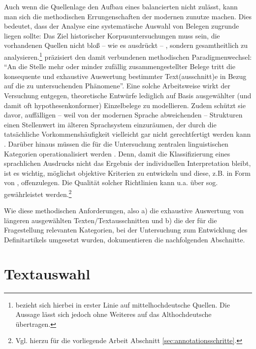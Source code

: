 Auch wenn die Quellenlage den Aufbau eines balancierten  nicht zulässt, kann man sich die methodischen Errungenschaften der modernen  zunutze machen. Dies bedeutet, dass der Analyse eine systematische Auswahl von Belegen zugrunde liegen sollte: Das Ziel historischer Korpusuntersuchungen  muss sein, die vorhandenen Quellen nicht bloß -- wie es \textcite[1310]{Wegera2000} ausdrückt -- , sondern gesamtheitlich zu analysieren.\footnote{\textcite{Wegera2000} bezieht sich hierbei in erster Linie auf mittelhochdeutsche Quellen. Die Aussage lässt sich jedoch ohne Weiteres auf das Althochdeutsche übertragen.} \textcite[382]{Fleischer2015} präzisiert den damit verbundenen methodischen Paradigmenwechsel:
"`An die Stelle mehr oder minder zufällig zusammengestellter Belege tritt die konsequente und exhaustive Auswertung bestimmter Text(ausschnitt)e in Bezug auf die zu untersuchenden Phänomene"'. Eine solche Arbeitsweise wirkt der Versuchung entgegen, theoretische Entwürfe lediglich auf Basis ausgewählter (und damit oft hypothesenkonformer) Einzelbelege zu modellieren. Zudem schützt sie davor, auffälligen -- weil von der modernen Sprache abweichenden -- Strukturen einen Stellenwert im älteren Sprachsystem einzuräumen, der durch die tatsächliche Vorkommenshäufigkeit vielleicht gar nicht gerechtfertigt werden kann \parencite[383]{Fleischer2015}. Darüber hinaus müssen die für die Untersuchung zentralen linguistischen Kategorien operationalisiert  werden  \parencite[113--116]{Lemnitzer2015}. Denn, damit die Klassifizierung eines sprachlichen Ausdrucks nicht das Ergebnis der individuellen Interpretation bleibt, ist es wichtig, möglichst objektive  Kriterien zu entwickeln und diese, z.B. in Form von , offenzulegen. Die Qualität solcher Richtlinien kann u.a. über sog.  gewährleistet  werden.\footnote{Vgl. hierzu für die vorliegende Arbeit Abschnitt \ref{sec:annotationsschritte}.} 

Wie diese methodischen Anforderungen, also a) die exhaustive Auswertung von längeren ausgewählten Texten/Textausschnitten und b) die  der für die Fragestellung relevanten Kategorien, bei der Untersuchung zum Entwicklung des Definitartikels  umgesetzt wurden, dokumentieren die nachfolgenden Abschnitte.


\section{Textauswahl}\label{sec:textauswahl}

